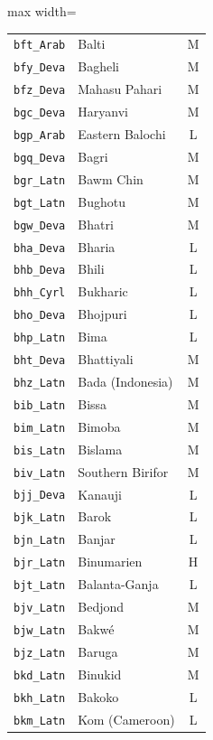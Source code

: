 {\begin{adjustbox}{max width=\textwidth}
\begin{tabular}{llc}
        \texttt{bft\_Arab} & Balti & M \\
        \texttt{bfy\_Deva} & Bagheli & M \\
        \texttt{bfz\_Deva} & Mahasu Pahari & M \\
        \texttt{bgc\_Deva} & Haryanvi & M \\
        \texttt{bgp\_Arab} & Eastern Balochi & L \\
        \texttt{bgq\_Deva} & Bagri & M \\
        \texttt{bgr\_Latn} & Bawm Chin & M \\
        \texttt{bgt\_Latn} & Bughotu & M \\
        \texttt{bgw\_Deva} & Bhatri & M \\
        \texttt{bha\_Deva} & Bharia & L \\
        \texttt{bhb\_Deva} & Bhili & L \\
        \texttt{bhh\_Cyrl} & Bukharic & L \\
        \texttt{bho\_Deva} & Bhojpuri & L \\
        \texttt{bhp\_Latn} & Bima & L \\
        \texttt{bht\_Deva} & Bhattiyali & M \\
        \texttt{bhz\_Latn} & Bada (Indonesia) & M \\
        \texttt{bib\_Latn} & Bissa & M \\
        \texttt{bim\_Latn} & Bimoba & M \\
        \texttt{bis\_Latn} & Bislama & M \\
        \texttt{biv\_Latn} & Southern Birifor & M \\
        \texttt{bjj\_Deva} & Kanauji & L \\
        \texttt{bjk\_Latn} & Barok & L \\
        \texttt{bjn\_Latn} & Banjar & L \\
        \texttt{bjr\_Latn} & Binumarien & H \\
        \texttt{bjt\_Latn} & Balanta-Ganja & L \\
        \texttt{bjv\_Latn} & Bedjond & M \\
        \texttt{bjw\_Latn} & Bakwé & M \\
        \texttt{bjz\_Latn} & Baruga & M \\
        \texttt{bkd\_Latn} & Binukid & M \\
        \texttt{bkh\_Latn} & Bakoko & L \\
        \texttt{bkm\_Latn} & Kom (Cameroon) & L \\

\end{tabular}
\end{adjustbox}}
